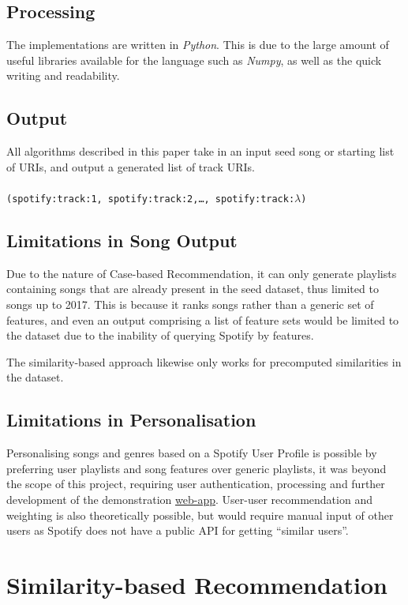 \documentclass[a4paper, 12pt]{report}
\begin{document}
\section{Processing}
The implementations are written in \emph{Python}.
This is due to the large amount of useful libraries available for the language such as \emph{Numpy}, as well as the quick 
writing and readability. 

\section{Output}
All algorithms described in this paper take in an input seed song or starting list of URIs, and output a generated list of track URIs.
\\
\\
\texttt{(spotify:track:1, spotify:track:2,\ldots, spotify:track:\(\lambda\))}

\section{Limitations in Song Output}
Due to the nature of Case-based Recommendation, it can only generate playlists containing songs that are already present in the seed dataset, 
thus limited to songs up to 2017.
This is because it ranks songs rather than a generic set of features, and even an output comprising a list of feature sets would be limited to the dataset
due to the inability of querying Spotify by features.

The similarity-based approach likewise only works for precomputed similarities in the dataset.

\section{Limitations in Personalisation}
Personalising songs and genres based on a Spotify User Profile is possible by preferring user playlists and song features
over generic playlists, it was beyond the scope of this project, requiring user authentication, processing and further development of the demonstration \hyperref[chap:webapp]{web-app}.
User-user recommendation and weighting is also theoretically possible, but would require manual input of other users as Spotify does not have a
public API for getting ``similar users''.


\chapter{Similarity-based Recommendation}
\end{document}
